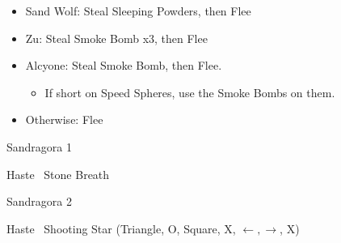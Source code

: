 \begin{encounters}
  \begin{itemize}
    \item Sand Wolf: Steal Sleeping Powders, then Flee
    \item Zu: Steal Smoke Bomb x3, then Flee
    \item Alcyone: Steal Smoke Bomb, then Flee.
          \begin{itemize}
            \item If short on Speed Spheres, use the Smoke Bombs on them.
          \end{itemize}
    \item Otherwise: Flee
  \end{itemize}
\end{encounters}
\begin{battle}{Sandragora 1}
  \begin{itemize}
    \tidusf Haste \kimahri
    \kimahrif \od\ Stone Breath
  \end{itemize}
\end{battle}
\begin{battle}{Sandragora 2}
  \begin{itemize}
    \tidusf Haste \auron
    \auronf \od\ Shooting Star (Triangle, O, Square, X, $\leftarrow, \rightarrow$, X)
  \end{itemize}
\end{battle}
